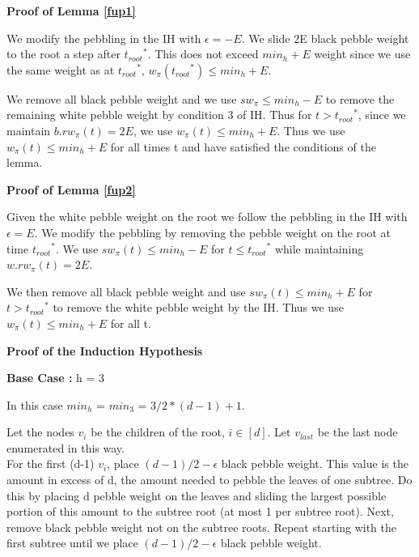 \documentclass[12pt]{article}
\newenvironment{proofL}{\hspace{.4em}}
                      {\hspace{\fill}{$\blacksquare$} \smallskip}
\newcommand{\troots}{{t_{root}}^*}
\begin{document}
\noindent
 {\bf Proof of Lemma \ref{fup1}}\begin{proofL} 
 
We modify the pebbling in the IH with $\epsilon=-E$. We slide 2E black pebble weight to the root a step after $\troots$. This does not exceed $min_h+E$ weight since we use the same weight as at $\troots$, $w_\pi(\troots) \leq min_h +E$. 

We remove all black pebble weight and we use $sw_\pi \leq min_h-E$ to remove the remaining white pebble weight by condition 3 of IH. Thus for $t > \troots$, since we maintain $b.rw_{\pi}(t) = 2E$, we use $w_\pi(t) \leq min_h+E$. Thus we use $w_\pi(t) \leq min_h+E$ for all times t and have satisfied the conditions of the lemma.
 
 \end{proofL} 

\noindent
 {\bf Proof of Lemma \ref{fup2}}\begin{proofL} 
 
Given the white pebble weight on the root we follow the pebbling in the IH with $\epsilon=E$. We modify the pebbling by removing the pebble weight on the root at time $\troots$. We use $sw_\pi(t) \leq min_h-E$ for $t \leq \troots$ while maintaining $w.rw_{\pi}(t) = 2E$. 

We then remove all black pebble weight and use $sw_\pi(t) \leq min_h+E$ for $t > \troots$ to remove the white pebble weight by the IH. Thus we use $w_\pi(t) \leq min_h+E$ for all t.
 
 \end{proofL} 




\noindent
{\bf Proof of the Induction Hypothesis}

\noindent
{\bf Base Case :} h = 3

In this case $min_h$ = $min_3$ = $3/2*(d-1) + 1$.

Let the nodes $v_i$ be the children of the root, $i \in [d]$. Let $v_{last}$ be the last node enumerated in this way.\\

For the first (d-1) $v_i$, place $(d-1)/2-\epsilon$ black pebble weight. This value is the amount in excess of d, the amount needed to pebble the leaves of one subtree. Do this by placing d pebble weight on the leaves and sliding the largest possible portion of this amount to the subtree root (at most 1 per subtree root). Next, remove black pebble weight not on the subtree roots. Repeat starting with the first subtree until we place $(d-1)/2-\epsilon$ black pebble weight.
\end{document}
